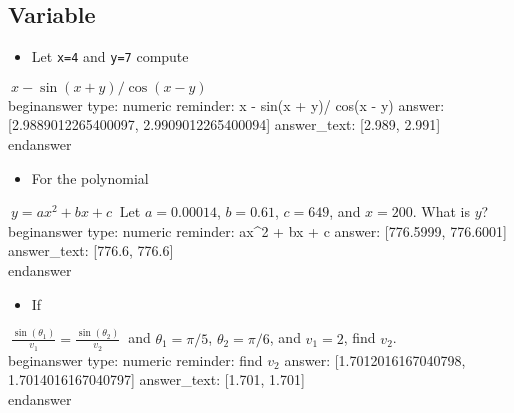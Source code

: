 \documentclass[12pt]{article}
\begin{document}
\subsection{Variable}\begin{itemize}\item Let \texttt{x=4} and \texttt{y=7} compute\end{itemize}$~
x - \sin(x + y)/\cos(x - y)
~$
\\begin{answer}
    type: numeric
    reminder: x - sin(x + y)/ cos(x - y)
    answer: [2.9889012265400097, 2.9909012265400094]
    answer_text: [2.989, 2.991] 
\\end{answer}
\begin{itemize}\item For the polynomial\end{itemize}$~
y = ax^2 + bx + c
~$\newline
Let $a=0.00014$, $b=0.61$, $c=649$, and $x=200$. What is $y$?
\\begin{answer}
    type: numeric
    reminder: ax^2 + bx + c
    answer: [776.5999, 776.6001]
    answer_text: [776.6, 776.6] 
\\end{answer}
\begin{itemize}\item If \end{itemize}$~
\frac{\sin(\theta_1)}{v_1} = \frac{\sin(\theta_2)}{v_2}
~$\newline
and $\theta_1 = \pi/5$, $\theta_2 = \pi/6$, and $v_1=2$, find $v_2$.
\\begin{answer}
    type: numeric
    reminder: find \(v_2\)
    answer: [1.7012016167040798, 1.7014016167040797]
    answer_text: [1.701, 1.701] 
\\end{answer}
\end{document}
